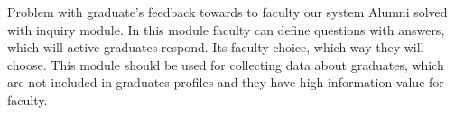 \documentclass{iitsrc}[2006/14/02]
\begin{document}
Problem with graduate’s feedback towards to faculty our system Alumni solved with inquiry module. In this module faculty can define questions with answers, which will active graduates respond. Its faculty choice, which way they will choose. This module should be used for collecting data about graduates, which are not included in graduates profiles and they have high information value for faculty.

  

\nocite{pcispec}
\nocite{ac97spec}
\nocite{ich4spec}
\nocite{crytalspec}
\nocite{osdesign}
\nocite{wdmdriver}
\nocite{alsadriver}
\nocite{pciwiki}



\end{document}
